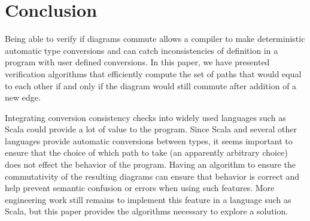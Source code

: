 \documentclass[sigplan]{acmart}
\begin{document}
\section{Conclusion}

Being able to verify if diagrams commute allows a compiler to make
deterministic automatic type conversions and can catch inconsistencies of definition in a program with user defined conversions.  In this paper, we have presented verification algorithms that efficiently compute the set of paths that would equal to each other if and only if the diagram would still commute after addition of a new edge.

Integrating conversion consistency checks into widely used languages such as Scala could provide a lot of value to the program.
Since Scala and several other languages provide automatic conversions between types, it seems important to ensure that the choice of which path to take (an apparently arbitrary choice) does not effect the behavior of the program.
Having an algorithm to ensure the commutativity of the resulting diagrams can ensure that behavior is correct and help prevent semantic confusion or errors when using such features.
More engineering work still remains to implement this feature in a language such as Scala, but this paper provides the algorithms necessary to explore a solution.



\end{document}
